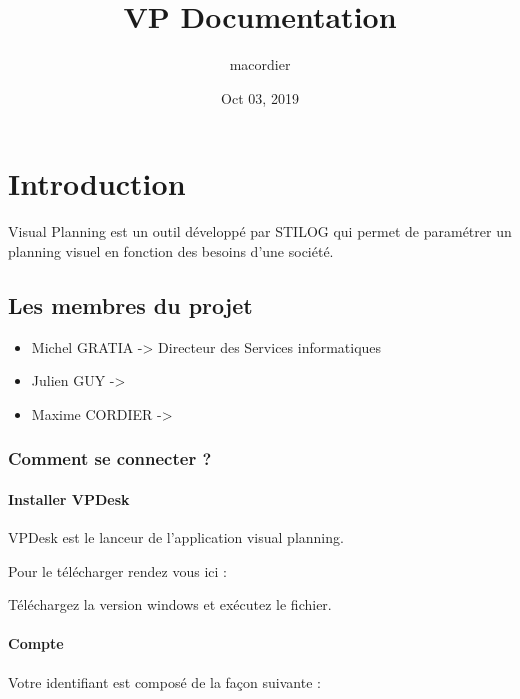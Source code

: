 \documentclass[letterpaper,10pt,english]{sphinxmanual}
\title{VP Documentation}
\date{Oct 03, 2019}
\author{macordier}
\begin{document}
\pagestyle{empty}
\sphinxmaketitle
\pagestyle{plain}
\sphinxtableofcontents
\pagestyle{normal}
\label{\detokenize{index::doc}}



\chapter{Introduction}
\label{\detokenize{index:introduction}}
Visual Planning est un outil développé par STILOG qui permet de paramétrer un planning visuel en fonction des besoins d’une société.


\section{Les membres du projet}
\label{\detokenize{index:les-membres-du-projet}}\begin{itemize}
\item {} 
Michel GRATIA -\textgreater{} Directeur des Services informatiques

\item {} 
Julien GUY -\textgreater{}

\item {} 
Maxime CORDIER -\textgreater{}

\end{itemize}


\subsection{Comment se connecter ?}
\label{\detokenize{guide_visual_planning/guide_utilisation:comment-se-connecter}}\label{\detokenize{guide_visual_planning/guide_utilisation::doc}}

\subsubsection{Installer VPDesk}
\label{\detokenize{guide_visual_planning/guide_utilisation:installer-vpdesk}}
VPDesk est le lanceur de l’application visual planning.

Pour le télécharger rendez vous ici : 

Téléchargez la version windows et exécutez le fichier.


\subsubsection{Compte}
\label{\detokenize{guide_visual_planning/guide_utilisation:compte}}
Votre identifiant est composé de la façon suivante :
\end{document}
